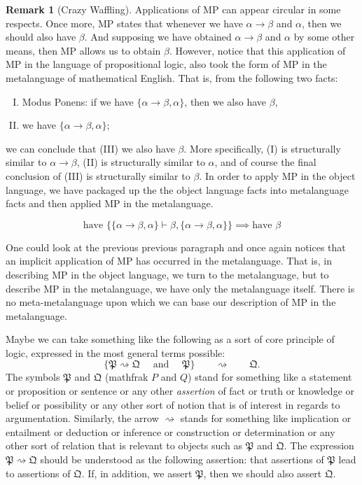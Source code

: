 \documentclass[12pt]{article}
\theoremstyle{definition}
\newtheorem{remark}[theorem]{Remark}
\newcommand{\<}{\langle}
\renewcommand{\>}{\rangle}
\begin{document}
\begin{remark}[Crazy Waffling]
    Applications of MP can appear circular in some respects.
    Once more, MP states that whenever we have $\alpha \to \beta$ and $\alpha$, then we should also have $\beta$.
    And supposing we have obtained $\alpha \to \beta$ and $\alpha$ by some other means, then MP allows us to obtain $\beta$.
    However, notice that this application of MP in the language of propositional logic, also took the form of MP in the metalanguage of mathematical English.
    That is, from the following two facts:
    \begin{enumerate}[(I)]
        \item Modus Ponens: if we have $\{\alpha \to \beta, \alpha\}$, then we also have $\beta$,
        \item we have $\{\alpha \to \beta, \alpha\}$;
    \end{enumerate}
    we can conclude that (III) we also have $\beta$.
    More specifically, (I) is structurally similar to $\alpha \to \beta$, (II) is structurally similar to $\alpha$, and of course the final conclusion of (III) is structurally similar to $\beta$.
    In order to apply MP in the object language, we have packaged up the the object language facts into metalanguage facts and then applied MP in the metalanguage.

    \[
        \text{have }\{ \{\alpha \to \beta, \alpha\} \vdash \beta,  \{\alpha \to \beta, \alpha\}\} \implies \text{have } \beta
    \]

    One could look at the previous previous paragraph and once again notices that an implicit application of MP has occurred in the metalanguage.
    That is, in describing MP in the object language, we turn to the metalanguage, but to describe MP in the metalanguage, we have only the metalanguage itself.
    There is no meta-metalanguage upon which we can base our description of MP in the metalanguage.

    Maybe we can take something like the following as a sort of core principle of logic, expressed in the most general terms possible:
    \[
        \{\mathfrak{P} \rightsquigarrow \mathfrak{Q} \quad\text{ and }\quad \mathfrak{P}\} \qquad\rightsquigarrow\qquad \mathfrak{Q}.
    \]
    The symbols $\mathfrak{P}$ and $\mathfrak{Q}$ (mathfrak $P$ and $Q$) stand for something like a statement or proposition or sentence or any other \emph{assertion} of fact or truth or knowledge or belief or possibility or any other sort of notion that is of interest in regards to argumentation.
    Similarly, the arrow $\rightsquigarrow$ stands for something like implication or entailment or deduction or inference or construction or determination or any other sort of relation that is relevant to objects such as $\mathfrak{P}$ and $\mathfrak{Q}$.
    The expression $\mathfrak{P} \rightsquigarrow \mathfrak{Q}$ should be understood as the following assertion: that assertions of $\mathfrak{P}$ lead to assertions of $\mathfrak{Q}$.
    If, in addition, we assert $\mathfrak{P}$, then we should also assert $\mathfrak{Q}$.


\end{remark}
\end{document}
